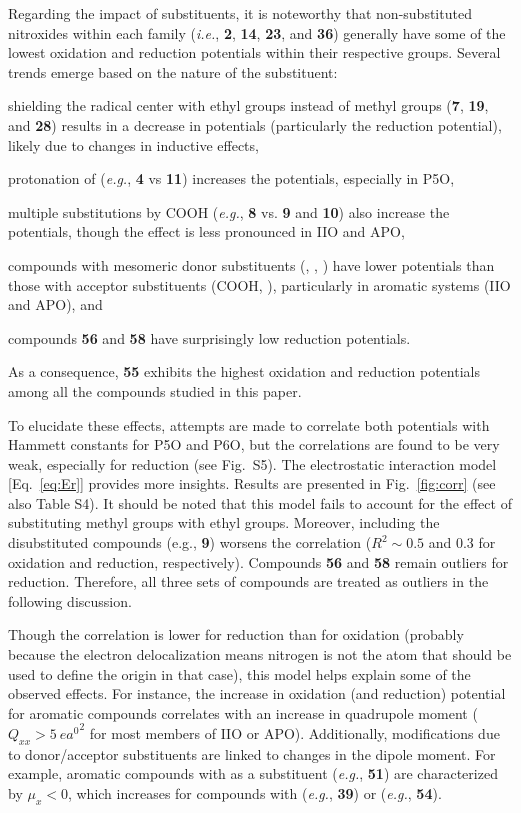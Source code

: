 \documentclass[review,preprint]{elsarticle}
\begin{document}
Regarding the impact of substituents, it is noteworthy that non-substituted nitroxides within each family (\textit{i.e.}, \textbf{2}, \textbf{14}, \textbf{23}, and \textbf{36}) generally have some of the lowest oxidation and reduction potentials within their respective groups. Several trends emerge based on the nature of the substituent: \begin{inparaenum}[(i)]
	\item shielding the radical center with ethyl groups instead of methyl groups (\textbf{7}, \textbf{19}, and \textbf{28}) results in a decrease in potentials (particularly the reduction potential), likely due to changes in inductive effects,
	\item protonation of  (\textit{e.g.}, \textbf{4} vs \textbf{11}) increases the potentials, especially in P5O,
	\item multiple substitutions by COOH (\textit{e.g.}, \textbf{8} vs. \textbf{9} and \textbf{10}) also increase the potentials, though the effect is less pronounced in IIO and APO,
	\item compounds with mesomeric donor substituents (, , ) have lower potentials than those with acceptor substituents (COOH, ), particularly in aromatic systems (IIO and APO), and
	\item compounds \textbf{56} and \textbf{58} have surprisingly low reduction potentials.
\end{inparaenum}
As a consequence, \textbf{55} exhibits the highest oxidation and reduction potentials among all the compounds studied in this paper.

To elucidate these effects, attempts are made to correlate both potentials with Hammett constants for P5O and P6O, but the correlations are found to be very weak, especially for reduction (see Fig.~S5). The electrostatic interaction model [Eq.~\eqref{eq:Er}] provides more insights. Results are presented in Fig.~\ref{fig:corr} (see also Table S4). It should be noted that this model fails to account for the effect of substituting methyl groups with ethyl groups. Moreover, including the disubstituted compounds (e.g., \textbf{9}) worsens the correlation ($R^2 \sim 0.5$ and 0.3 for oxidation and reduction, respectively). Compounds \textbf{56} and \textbf{58} remain outliers for reduction. Therefore, all three sets of compounds are treated as outliers in the following discussion.

Though the correlation is lower for reduction than for oxidation (probably because the electron delocalization means nitrogen is not the atom that should be used to define the origin in that case), this model helps explain some of the observed effects. For instance, the increase in oxidation (and reduction) potential for aromatic compounds correlates with an increase in quadrupole moment ($Q_{xx} > \SI{5}{\elementarycharge\bohr\squared}$ for most members of IIO or APO). Additionally, modifications due to donor/acceptor substituents are linked to changes in the dipole moment. For example, aromatic compounds with  as a substituent (\textit{e.g.}, \textbf{51}) are characterized by $\mu_{x} < 0$, which increases for compounds with  (\textit{e.g.}, \textbf{39}) or  (\textit{e.g.}, \textbf{54}). 
\end{document}
